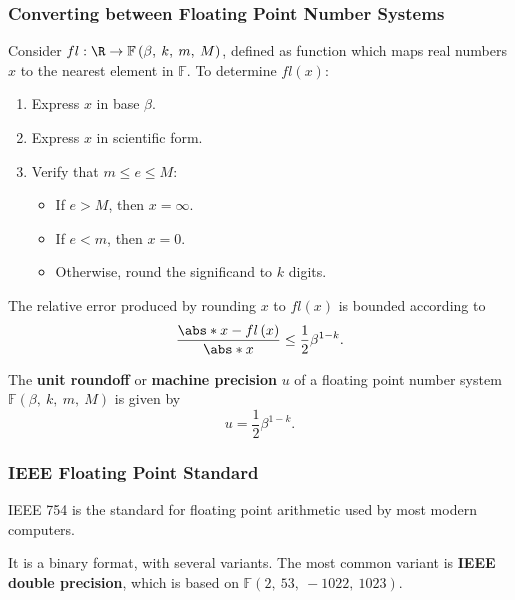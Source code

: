 \documentclass{article}
\begin{document}
\subsubsection{Converting between Floating Point Number Systems}
Consider \(fl : \R \to \mathbb{F}\left( \beta,\: k,\: m,\: M \right)\), defined as function which maps
real numbers \(x\) to the nearest element in
\(\mathbb{F}\). To determine \(fl\left( x \right)\):
\begin{enumerate}
    \item Express \(x\) in base \(\beta\).
    \item Express \(x\) in scientific form.
    \item Verify that \(m \leq e \leq M\):
          \begin{itemize}
              \item If \(e > M\), then \(x = \infty\).
              \item If \(e < m\), then \(x = 0\).
              \item Otherwise, round the significand to \(k\) digits.
          \end{itemize}
\end{enumerate}
The relative error produced by rounding \(x\) to \(fl\left( x \right)\) is bounded
according to
\begin{equation*}
    \frac{\abs*{x - fl\left( x \right)}}{\abs*{x}} \leq \frac{1}{2} \beta^{1 - k}.
\end{equation*}
\begin{definition}
    The \textbf{unit roundoff} or \textbf{machine precision} \(u\) of a floating point number system \(\mathbb{F}\left( \beta,\: k,\: m,\: M \right)\)
    is given by
    \begin{equation*}
        u = \frac{1}{2} \beta^{1 - k}.
    \end{equation*}
\end{definition}
\subsubsection{IEEE Floating Point Standard}
IEEE 754 is the standard for floating point arithmetic used by most modern computers.

It is a binary format, with several variants. The most common variant is \textbf{IEEE double precision},
which is based on \(\mathbb{F}\left( 2,\: 53,\: -1022,\: 1023 \right)\).
\end{document}
